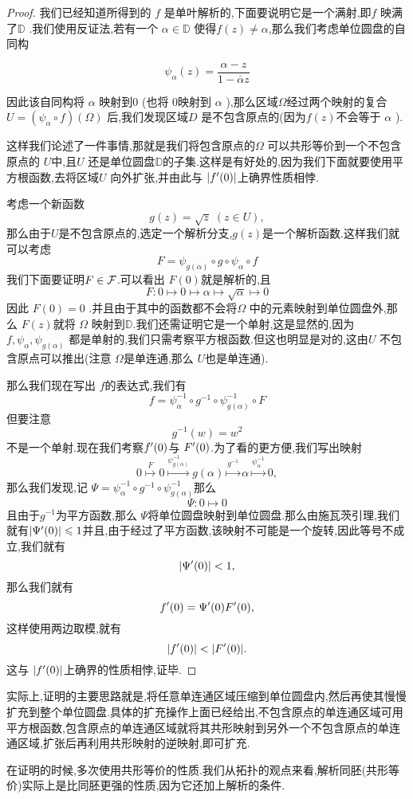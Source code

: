 \begin{proof}
我们已经知道所得到的 $f$ 是单叶解析的,下面要说明它是一个满射,即$f$ 映满了$\mathbb{D}$ .我们使用反证法,若有一个 $\alpha\in\mathbb{D}$ 使得$f(z)\neq \alpha$,那么我们考虑单位圆盘的自同构

\[\psi_\alpha (z)=\frac{\alpha-z}{1-\overline{\alpha} z}\]

因此该自同构将 $\alpha$ 映射到$0$ (也将 $0$映射到 $\alpha$ ),那么区域$\Omega$经过两个映射的复合$U=(\psi_\alpha \circ f)(\Omega)$ 后,我们发现区域$D$ 是不包含原点的(因为$f(z)$不会等于 $\alpha$ ).


这样我们论述了一件事情,那就是我们将包含原点的$\Omega$ 可以共形等价到一个不包含原点的 $U$中,且$U$ 还是单位圆盘$\mathbb{D}$的子集.这样是有好处的,因为我们下面就要使用平方根函数,去将区域$U$ 向外扩张,并由此与 $\abs{f^\prime (0)}$上确界性质相悖.


考虑一个新函数
\[g(z)=\sqrt{z}\; (z\in U),\]
那么由于$U$是不包含原点的,选定一个解析分支,$g(z)$是一个解析函数.这样我们就可以考虑
\[F=\psi_{g(\alpha)}\circ g\circ \psi_\alpha \circ f\]
我们下面要证明$F\in \mathcal{F}$.可以看出 $F(0)$就是解析的,且
\[F\colon 0\mapsto 0\mapsto \alpha \mapsto \sqrt{\alpha}\mapsto 0\]
因此 $F(0)=0$ .并且由于其中的函数都不会将$\Omega$ 中的元素映射到单位圆盘外,那么 $F(z)$就将 $\Omega$ 映射到$\mathbb{D}$.我们还需证明它是一个单射,这是显然的,因为 $f,\psi_{\alpha},\psi_{g(\alpha)}$ 都是单射的,我们只需考察平方根函数.但这也明显是对的,这由$U$ 不包含原点可以推出(注意 $\Omega$是单连通,那么 $U$也是单连通).

那么我们现在写出 $f$的表达式,我们有
\[f=\psi_{\alpha}^{-1}\circ g^{-1}\circ \psi_{g(\alpha)}^{-1}\circ F\]
但要注意
\[g^{-1}(w)=w^2\]
不是一个单射.现在我们考察$f^\prime (0)$与 $F^\prime (0)$.为了看的更方便,我们写出映射
\[0\stackrel{F}{\mapsto}0\stackrel{\psi_{g(\alpha)}^{-1}}{\mapsto}g(\alpha)\stackrel{g^{-1}}{\mapsto}\alpha\stackrel{\psi_\alpha^{-1}}{\mapsto}0,\]
那么我们发现,记 $\Psi=\psi_\alpha^{-1}\circ g^{-1}\circ \psi_{g(\alpha)}^{-1}$那么
\[\Psi\colon 0\mapsto 0\]
且由于$g^{-1}$为平方函数,那么 $\Psi$将单位圆盘映射到单位圆盘.那么由施瓦茨引理,我们就有$\abs{\Psi^\prime (0)}\leqslant 1$并且,由于经过了平方函数,该映射不可能是一个旋转,因此等号不成立,我们就有
\[\abs{\Psi^\prime (0)}<1,\]
那么我们就有
\[f^\prime (0)=\Psi^\prime (0)F^\prime (0),\]
这样使用两边取模,就有
\[\abs{f^\prime (0)}<\abs{F^\prime (0)}.\]
这与 $\abs{f^\prime (0)}$上确界的性质相悖,证毕.
\end{proof}
\renewcommand{\Remark}{$\bccrayon$ 总~结}
\begin{remark}[]
实际上,证明的主要思路就是,将任意单连通区域压缩到单位圆盘内,然后再使其慢慢扩充到整个单位圆盘.具体的扩充操作上面已经给出,不包含原点的单连通区域可用平方根函数,包含原点的单连通区域就将其共形映射到另外一个不包含原点的单连通区域,扩张后再利用共形映射的逆映射,即可扩充.


在证明的时候,多次使用共形等价的性质.我们从拓扑的观点来看,解析同胚(共形等价)实际上是比同胚更强的性质,因为它还加上解析的条件.
\end{remark}
